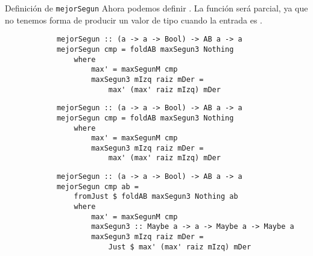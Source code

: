 \begin{frame}[fragile]{Definición de \texttt{mejorSegun}}
    Ahora podemos definir . La función será \alert{parcial}, ya que no tenemos forma de producir un valor de tipo  cuando la entrada es .

    \vspace{10pt}

    \pause

    \begin{overprint}
        \begin{verbatim}
            mejorSegun :: (a -> a -> Bool) -> AB a -> a
            mejorSegun cmp = foldAB maxSegun3 Nothing
                where
                    max' = maxSegunM cmp
                    maxSegun3 mIzq raiz mDer =
                        max' (max' raiz mIzq) mDer
        \end{verbatim}

        \pause

        \begin{verbatim}
            mejorSegun :: (a -> a -> Bool) -> AB a -> a
            mejorSegun cmp = foldAB maxSegun3 Nothing
                where
                    max' = maxSegunM cmp
                    maxSegun3 mIzq raiz mDer =
                        max' (max' raiz mIzq) mDer
        \end{verbatim}

        \pause

        \begin{verbatim}
            mejorSegun :: (a -> a -> Bool) -> AB a -> a
            mejorSegun cmp ab =
                fromJust $ foldAB maxSegun3 Nothing ab
                where
                    max' = maxSegunM cmp
                    maxSegun3 :: Maybe a -> a -> Maybe a -> Maybe a
                    maxSegun3 mIzq raiz mDer =
                        Just $ max' (max' raiz mIzq) mDer
        \end{verbatim}
    \end{overprint}
    

\end{frame}
